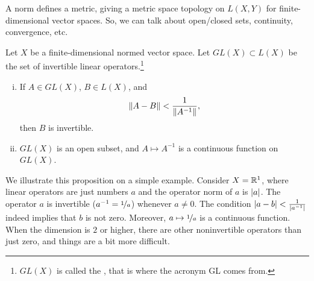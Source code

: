 A norm defines a metric,
giving a metric space topology on $L(X,Y)$ for finite-dimensional vector spaces.
So, we can talk
about open/closed sets, continuity, convergence, etc.

\begin{prop} \label{prop:finitedimpropinv}
Let $X$ be a finite-dimensional normed vector space.
Let $GL(X) \subset L(X)$ be the set of invertible linear
operators.\footnote{$GL(X)$ is called the
\emph{}, that is where the acronym GL
comes from.}
\begin{enumerate}[(i)]
\item \label{finitedimpropinv:i}
If $A \in GL(X)$, $B \in L(X)$, and
\begin{equation} \label{eqcontineq}
\lVert {A-B} \rVert <  \frac{1}{\lVert {A^{-1}} \rVert},
\end{equation}
then $B$ is invertible.
\item \label{finitedimpropinv:ii}
$GL(X)$ is an open subset, and $A \mapsto A^{-1}$ is a continuous
function on $GL(X)$.
\end{enumerate}
\end{prop}

We illustrate this proposition on a simple example.
Consider $X={\mathbb{R}}^1$, where linear operators are just
numbers $a$ and the operator norm of $a$ is $\lvert {a} \rvert$.
The operator $a$ is invertible ($a^{-1} = \nicefrac{1}{a}$)
whenever $a \not=0$.  The condition $\lvert {a-b} \rvert < \frac{1}{\lvert {a^{-1}} \rvert}$
indeed implies that $b$ is not zero.  Moreover, $a \mapsto \nicefrac{1}{a}$
is a continuous function.
When the dimension is $2$ or higher,
there are other noninvertible operators than just zero,
and things are a bit more difficult.

